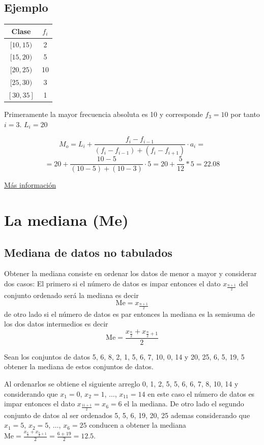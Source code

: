 \documentclass[10pt,]{krantz}
\theoremstyle{definition}
\theoremstyle{definition}
\theoremstyle{definition}
\theoremstyle{definition}
\theoremstyle{remark}
\begin{document}
\hypertarget{ejemplo-1}{%
\subsection{Ejemplo}\label{ejemplo-1}}

\begin{longtable}[]{@{}cc@{}}
\toprule
Clase & \(f_i\)\tabularnewline
\midrule
\endhead
\([10,15)\) & 2\tabularnewline
\([15,20)\) & 5\tabularnewline
\([20,25)\) & 10\tabularnewline
\([25,30)\) & 3\tabularnewline
\([30,35]\) & 1\tabularnewline
\bottomrule
\end{longtable}

Primeramente la mayor frecuencia absoluta es 10 y corresponde \(f_3=10\) por tanto \(i=3\). \(L_i=20\)

\[ M_o=L_i+\frac{f_i-f_{i-1}}{(f_i-f_{i-1})+(f_i-f_{i+1})}\cdot a_i=\] \[ =20+\frac{10-5}{(10-5)+(10-3)}\cdot 5=20+\frac{5}{12}*5=22.08\]

\href{https://www.superprof.es/apuntes/escolar/matematicas/estadistica/descriptiva/moda-estadistica.html}{Más información}

\hypertarget{la-mediana-me}{%
\section{La mediana (Me)}\label{la-mediana-me}}

\hypertarget{mediana-de-datos-no-tabulados}{%
\subsection{Mediana de datos no tabulados}\label{mediana-de-datos-no-tabulados}}

Obtener la mediana consiste en ordenar los datos de menor a mayor y considerar dos casos: El primero si el número de datos es impar entonces el dato \(x_{\frac{n+1}{2}}\) del conjunto ordenado será la mediana es decir \[\text{Me}=x_{\frac{n+1}{2}}\] de otro lado si el número de datos es par entonces la mediana es la semisuma de los dos datos intermedios es decir \[\text{Me}=\frac{x_{\frac{n}{2}}+x_{\frac{n}{2}+1}}{2}\]

Sean los conjuntos de datos 5, 6, 8, 2, 1, 5, 6, 7, 10, 0, 14 y 20, 25, 6, 5, 19, 5 obtener la mediana de estos conjuntos de datos.

Al ordenarlos se obtiene el siguiente arreglo 0, 1, 2, 5, 5, 6, 6, 7, 8, 10, 14 y considerando que \(x_1=0\), \(x_2=1\), \(\ldots\), \(x_{11}=14\) en este caso el número de datos es impar entonces el dato \(x_{\frac{11+1}{2}}=x_{6}=6\) el la mediana. De otro lado el segundo conjunto de datos al ser ordenados 5, 5, 6, 19, 20, 25 ademas considerando que \(x_1=5\), \(x_2=5\), \(\ldots\), \(x_6=25\) conducen a obtener la mediana \(\text{Me}=\frac{x_{\frac{6}{2}}+x_{\frac{6}{2}+1}}{2}=\frac{6+19}{2}=12.5\).
\end{document}
